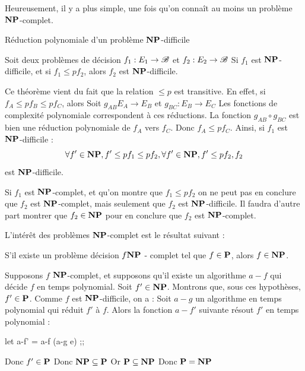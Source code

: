 \documentclass[a4paper,french,bookmarks]{book}
\newcommand{\cP}{\bbP}
\newcommand{\cNP}{\bbN\bbP}
\begin{document}
    Heureusement, il y a plus simple, une fois qu'on connaît au moins un problème $\cNP$-complet.

    \begin{theorem}{Réduction polynomiale d'un problème $\cNP$-difficile}{}

        Soit deux problèmes de décision $f_1 : E_1 \to \mathscr{B}$ et $f_2 : E_2 \to \mathscr{B}$
        Si $f_1$ est $\cNP$-difficile, et si $f_1 \leq pf _2$, alors $f_2$ est $\cNP$-difficile.
        
    \end{theorem}

    \begin{nproof}
    
        Ce théorème vient du fait que la relation $\leq p$ est transitive.
        En effet, si $f_A \leq p f_B \leq p f_C$, alors
        Soit $g_{AB} E_A \to E_B$ et $g_{BC} : E_B \to E_C$
        Les fonctions de complexité polynomiale correspondent à ces réductions.
        La fonction $g_{AB} \circ g_{BC}$ est bien une réduction polynomiale de $f_A$ vers $f_C$.
        Donc $f_A \leq p f_C$.
        Ainsi, si $f_1$ est $\cNP$-difficile :
        \[\forall f' \in \cNP, f' \leq p f_1 \leq p f_2,
        \forall f' \in \cNP, f' \leq p f_2,
        f_2\] est $\cNP$-difficile.
        
    \end{nproof}

    \begin{warning}{}{}

        Si $f_1$ est $\cNP$-complet, et qu'on montre que $f_1 \leq p f_2$ on ne peut pas en conclure que $f_2$ est $\cNP$-complet, mais seulement que $f_2$ est $\cNP$-difficile.
        Il faudra d'autre part montrer que $f_2 \in \cNP$ pour en conclure que $f_2$ est $\cNP$-complet.
        
    \end{warning}

    L'intérêt des problèmes $\cNP$-complet est le résultat suivant :

    \begin{theorem}{}{}

        S'il existe un problème décision $f \cNP$ - complet tel que $f \in \cP$, alors $f \in \cNP$.
        
    \end{theorem}

    \begin{nproof}
        Supposons $f$ $\cNP$-complet, et supposons qu'il existe un algorithme $a-f$ qui décide $f$ en temps polynomial.
        Soit $f' \in \cNP$. Montrons que, sous ces hypothèses, $f' \in \cP$.
        Comme $f$ est $\cNP$-difficile, on a :
        Soit $a-g$ un algorithme en temps polynomial qui réduit $f'$ à $f$.
        Alors la fonction $a-f'$ suivante résout $f'$ en temps polynomial :
        \begin{ocaml}
let a-f' = a-f (a-g e) ;;
        \end{ocaml}
        Donc $f' \in \cP$
        Donc $\cNP \subseteq \cP$
        Or $\cP \subseteq \cNP$
        Donc $\cP = \cNP$
        
    \end{nproof}
\end{document}
